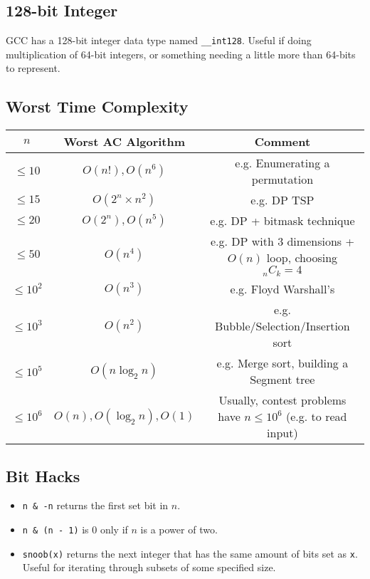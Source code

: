 \documentclass[9pt,a4paper,twocolumn,landscape,oneside]{amsart}
\newcommand{\code}[1]{\inputminted{cpp}{_code/#1}}
\begin{document}
    \subsection{128-bit Integer}
        GCC has a 128-bit integer data type named \texttt{\_\_int128}. Useful
        if doing multiplication of 64-bit integers, or something needing a
        little more than 64-bits to represent.

    \subsection{Worst Time Complexity}
    \begin{center}
        \begin{tabular}{c|c|c}
            $n$ & Worst AC Algorithm & Comment \\
            \hline
            $\leq 10$ & $O(n!), O(n^6)$ & e.g. Enumerating a permutation \\
            $\leq 15$ & $O(2^n\times n^2)$ & e.g. DP TSP \\
            $\leq 20$ & $O(2^n), O(n^5)$ & e.g. DP + bitmask technique \\
            $\leq 50$ & $O(n^4)$ & e.g. DP with 3 dimensions + $O(n)$ loop, choosing  $_nC_k=4$ \\
            $\leq 10^2$ & $O(n^3)$ & e.g. Floyd Warshall's \\
            $\leq 10^3$ & $O(n^2)$ & e.g. Bubble/Selection/Insertion sort \\
            $\leq 10^5$ & $O(n\log_2{n})$ & e.g. Merge sort, building a Segment tree \\
            $\leq 10^6$ & $O(n), O(\log_2{n}), O(1)$ & Usually, contest problems have $n\leq10^6$ (e.g. to read input) \\
        \end{tabular}
    \end{center}

    \subsection{Bit Hacks}
        \begin{itemize}
            \item \texttt{n \&{} -n} returns the first set bit in $n$.
            \item \texttt{n \&{} (n - 1)} is $0$ only if $n$ is a power of two.
            \item \texttt{snoob(x)} returns the next integer that has the
                same amount of bits set as \texttt{x}. Useful for iterating
                through subsets of some specified size.
                \code{tricks/snoob.cpp}
        \end{itemize}
\end{document}
